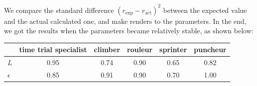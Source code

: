 \documentclass{article}
\begin{document}
			We compare the standard difference \(\left( r_{\exp}-r_{\mathrm{act}} \right) ^2\) between the expected value and the actual calculated one, and make renders to the parameters. In the end, we got the results when the parameters became relatively stable, as shown below:

			\begin{center}
				\begin{tabular}{|l||c|c|c|c|c|}
					\hline
					&\textbf{time trial specialist} & \textbf{climber} & \textbf{rouleur} & \textbf{sprinter} & \textbf{puncheur} \\
					\hline
					\hline
					\(L\) & 0.95 & 0.74 & 0.90 & 0.65 & 0.82 \\
					\hline
					\(\epsilon\) & 0.85 & 0.91 & 0.90 & 0.70 & 1.00 \\
					\hline
				\end{tabular}
			\end{center}
\end{document}
